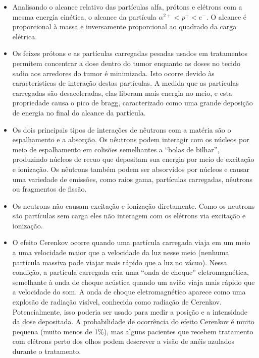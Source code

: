 \documentclass[11pt,a4paper]{article}
\newcounter{exemplo}
\begin{document}
\begin{exemplo}
\begin{itemize}
        \item Analisando o alcance relativo das partículas alfa, prótons e elétrons com a mesma energia cinética, o alcance da partícula $\alpha^{2+} < p^{+} < e^{-}$. O alcance é proporcional à massa e inversamente proporcional ao quadrado da carga elétrica.
        
        \item Os feixes prótons e as partículas carregadas pesadas usados em tratamentos permitem concentrar a dose dentro do tumor enquanto as doses no tecido sadio aos arredores do tumor é minimizada. Isto ocorre devido às caracteristicas de interação destas partículas. A medida que as partículas carregadas são desaceleradas, elas liberam mais energia no meio, e esta propriedade causa o pico de bragg, caracterizado como uma grande deposição de energia no final do alcance da partícula. 
        
        \item Os dois principais tipos de interações de nêutrons com a matéria são o espalhamento e a absorção. Os nêutrons podem interagir com os núcleos por meio de espalhamento em colisões semelhantes a “bolas de bilhar”, produzindo núcleos de recuo que depositam sua energia por meio de excitação e ionização. Os nêutrons também podem ser absorvidos por núcleos e causar uma variedade de emissões, como raios gama, partículas carregadas, nêutrons ou fragmentos de fissão.
        
        \item Os neutrons não causam excitação e ionização diretamente. Como os neutrons são partículas sem carga eles não interagem com os elétrons via excitação e ionização.
        
        \item O efeito Cerenkov ocorre quando uma partícula carregada viaja em um meio a uma velocidade maior que a velocidade da luz nesse meio (nenhuma partícula massiva pode viajar mais rápido que a luz no vácuo). Nessa condição, a partícula carregada cria uma “onda de choque” eletromagnética, semelhante à onda de choque acústica quando um avião viaja mais rápido que a velocidade do som. A onda de choque eletromagnético aparece como uma explosão de radiação visível, conhecida como radiação de Cerenkov. Potencialmente, isso poderia ser usado para medir a posição e a intensidade da dose depositada. A probabilidade de ocorrência do efeito Cerenkov é muito pequena (muito menos de 1\%), mas alguns pacientes que recebem tratamento com elétrons perto dos olhos podem descrever a visão de anéis azulados durante o tratamento.
        
    \end{itemize}
\end{exemplo}
\end{document}

